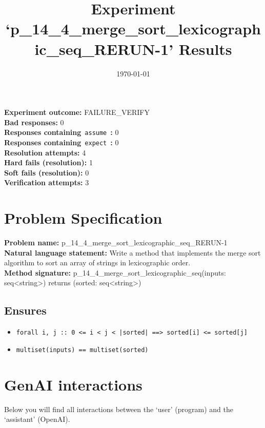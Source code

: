 \documentclass{article}
\begin{document}
\title{Experiment `p\_14\_4\_merge\_sort\_lexicographic\_seq\_RERUN-1' Results}
\author{\today}
\date{}
\maketitle
\textbf{Experiment outcome: }FAILURE\_VERIFY
\\\textbf{Bad responses: }0
\\\textbf{Responses containing}~\texttt{assume}~\textbf{: }0
\\\textbf{Responses containing}~\texttt{expect}~\textbf{: }0
\\\textbf{Resolution attempts: }4
\\\textbf{Hard fails (resolution): }1
\\\textbf{Soft fails (resolution): }0
\\\textbf{Verification attempts: }3
\section*{Problem Specification}
\textbf{Problem name: }p\_14\_4\_merge\_sort\_lexicographic\_seq\_RERUN-1
\\\textbf{Natural language statement: }Write a method that implements the merge sort algorithm to sort an array of strings in lexicographic order.
\\\textbf{Method signature: }p\_14\_4\_merge\_sort\_lexicographic\_seq(inputs: seq<string>) returns (sorted: seq<string>)
\subsection*{Ensures}
\begin{itemize}
\item \texttt{forall i, j :: 0 <= i < j < |sorted| ==> sorted[i] <= sorted[j]}
\item \texttt{multiset(inputs) == multiset(sorted)}
\end{itemize}
\clearpage
\section*{GenAI interactions}
Below you will find all interactions between the `user' (program) and the `assistant' (OpenAI).
\end{document}
